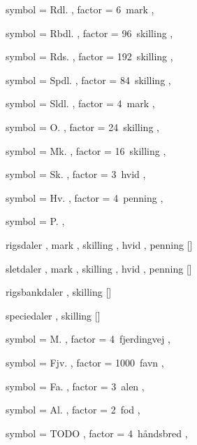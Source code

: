 
 {
	symbol = { Rdl. } ,
	factor = { 6~mark } ,
}

 {
	symbol = { Rbdl. } ,
	factor = { 96~skilling } ,
}

 {
	symbol = { Rds. } ,
	factor = { 192~skilling } ,
}

 {
	symbol = { Spdl. } ,
	factor = { 84~skilling } ,
}

 {
	symbol = { Sldl. } ,
	factor = { 4~mark } ,
}

 {
	symbol = { O. } ,
	factor = { 24~skilling } ,
}

 {
	symbol = { Mk. } ,
	factor = { 16~skilling } ,
}

 {
	symbol = { Sk. } ,
	factor = { 3~hvid } ,
}

 {
	symbol = { Hv. } ,
	factor = { 4~penning } ,
}

 {
	symbol = { P. } ,
}

 {
	rigsdaler ,
	mark ,
	skilling ,
	hvid ,
	penning
}[\rdl]

 {
	sletdaler ,
	mark ,
	skilling ,
	hvid ,
	penning
}[\sldl]

 {
	rigsbankdaler ,
	skilling
}[\rbdl]

 {
	speciedaler ,
	skilling
}[\spdl]



 {
	symbol = { M. } ,
	factor = { 4~fjerdingvej } ,
}

 {
	symbol = { Fjv. } ,
	factor = { 1000~favn } ,
}

 {
	symbol = { Fa. } ,
	factor = { 3~alen } ,
}

 {
	symbol = { Al. } ,
	factor = { 2~fod } ,
}

 {
	symbol = { TODO } ,
	factor = { 4~håndsbred } ,
}

